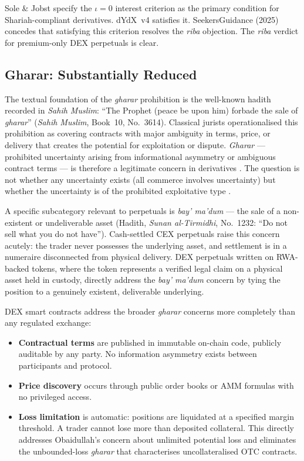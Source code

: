 \documentclass[10pt,twocolumn]{article}
\begin{document}
Sole \& Jobst \cite{SoleJobst2012} specify the $\iota=0$ interest criterion as
the primary condition for Shariah-compliant derivatives. dYdX~v4 satisfies it.
SeekersGuidance (2025) \cite{SeekersGuidance2025} concedes that satisfying this
criterion resolves the \textit{riba} objection. The \textit{riba} verdict for
premium-only DEX perpetuals is clear.

\subsection{Gharar: Substantially Reduced}

The textual foundation of the \textit{gharar} prohibition is the well-known
hadith recorded in \textit{Sahih Muslim}: ``The Prophet (peace be upon him) forbade
the sale of \textit{gharar}'' (\textit{Sahih Muslim}, Book~10, No.~3614).
Classical jurists operationalised this prohibition as covering contracts with
major ambiguity in terms, price, or delivery that creates the potential for
exploitation or dispute. \textit{Gharar} --- prohibited uncertainty arising
from informational asymmetry or ambiguous contract terms --- is therefore a
legitimate concern in derivatives \cite{ElGamal2001,Alias2015,AliasOthman2024}.
The question is not whether any uncertainty exists (all commerce involves
uncertainty) but whether the uncertainty is of the prohibited exploitative type
\cite{ElGamal2001}.

A specific subcategory relevant to perpetuals is \textit{bay' ma'dum} --- the
sale of a non-existent or undeliverable asset (Hadith, \textit{Sunan
al-Tirmidhi}, No.~1232: ``Do not sell what you do not have'').
Cash-settled CEX perpetuals raise this concern acutely: the trader never
possesses the underlying asset, and settlement is in a numeraire disconnected
from physical delivery.
DEX perpetuals written on RWA-backed tokens, where the token represents a
verified legal claim on a physical asset held in custody, directly address the
\textit{bay' ma'dum} concern by tying the position to a genuinely existent,
deliverable underlying.

DEX smart contracts address the broader \textit{gharar} concerns more
completely than any regulated exchange:

\begin{itemize}[noitemsep, leftmargin=*]
\item \textbf{Contractual terms} are published in immutable on-chain code,
publicly auditable by any party. No information asymmetry exists between
participants and protocol.
\item \textbf{Price discovery} occurs through public order books or AMM
formulas with no privileged access.
\item \textbf{Loss limitation} is automatic: positions are liquidated at a
specified margin threshold. A trader cannot lose more than deposited collateral.
This directly addresses Obaidullah's \cite{Obaidullah2005} concern about
unlimited potential loss and eliminates the unbounded-loss \textit{gharar}
that characterises uncollateralised OTC contracts.
\end{itemize}
\end{document}
